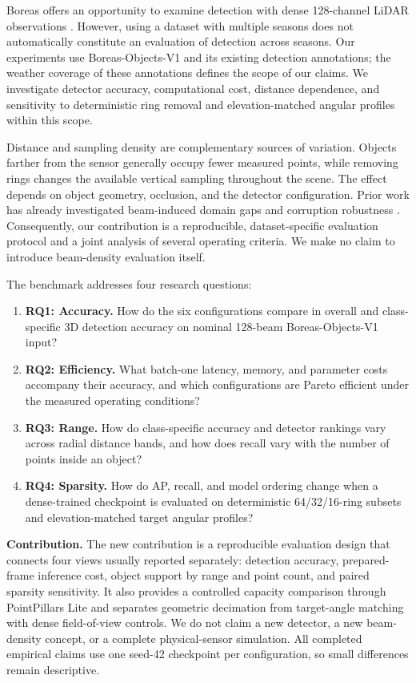 \documentclass[10pt,twocolumn]{article}
\begin{document}
Boreas offers an opportunity to examine detection with dense 128-channel LiDAR observations \cite{burnett2023boreas}. However, using a dataset with multiple seasons does not automatically constitute an evaluation of detection across seasons. Our experiments use Boreas-Objects-V1 and its existing detection annotations; the weather coverage of these annotations defines the scope of our claims. We investigate detector accuracy, computational cost, distance dependence, and sensitivity to deterministic ring removal and elevation-matched angular profiles within this scope.

Distance and sampling density are complementary sources of variation. Objects farther from the sensor generally occupy fewer measured points, while removing rings changes the available vertical sampling throughout the scene. The effect depends on object geometry, occlusion, and the detector configuration. Prior work has already investigated beam-induced domain gaps and corruption robustness \cite{wei2022lidardistillation,griesbacher2025beamdensity,kong2023robo3d,dong2023corruptions}. Consequently, our contribution is a reproducible, dataset-specific evaluation protocol and a joint analysis of several operating criteria. We make no claim to introduce beam-density evaluation itself.

The benchmark addresses four research questions:
\begin{enumerate}
\item \textbf{RQ1: Accuracy.} How do the six configurations compare in overall and class-specific 3D detection accuracy on nominal 128-beam Boreas-Objects-V1 input?
\item \textbf{RQ2: Efficiency.} What batch-one latency, memory, and parameter costs accompany their accuracy, and which configurations are Pareto efficient under the measured operating conditions?
\item \textbf{RQ3: Range.} How do class-specific accuracy and detector rankings vary across radial distance bands, and how does recall vary with the number of points inside an object?
\item \textbf{RQ4: Sparsity.} How do AP, recall, and model ordering change when a dense-trained checkpoint is evaluated on deterministic 64/32/16-ring subsets and elevation-matched target angular profiles?
\end{enumerate}

\textbf{Contribution.} The new contribution is a reproducible evaluation design that connects four views usually reported separately: detection accuracy, prepared-frame inference cost, object support by range and point count, and paired sparsity sensitivity. It also provides a controlled capacity comparison through PointPillars Lite and separates geometric decimation from target-angle matching with dense field-of-view controls. We do not claim a new detector, a new beam-density concept, or a complete physical-sensor simulation. All completed empirical claims use one seed-42 checkpoint per configuration, so small differences remain descriptive.
\end{document}
